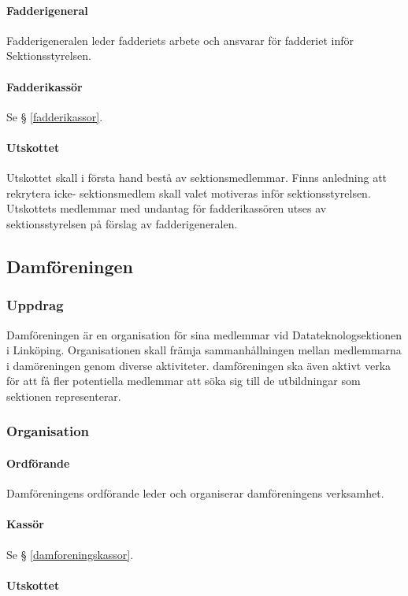 \documentclass{datateknologsektionen-document}
\begin{document}
\paragraph{Fadderigeneral}
Fadderigeneralen leder fadderiets arbete och ansvarar för fadderiet inför Sektionsstyrelsen.
\paragraph{Fadderikassör}
Se § \ref{fadderikassor}.
\paragraph{Utskottet}

Utskottet skall i första hand bestå av sektionsmedlemmar. Finns anledning att rekrytera icke-
sektionsmedlem skall valet motiveras inför sektionsstyrelsen. Utskottets medlemmar med
undantag för fadderikassören utses av sektionsstyrelsen på förslag av fadderigeneralen.
\subsection{Damföreningen}
\label{damforeningen}
\subsubsection{Uppdrag}
Damföreningen är en organisation för sina medlemmar vid Datateknologsektionen i Linköping.
Organisationen skall främja sammanhållningen mellan medlemmarna i damöreningen genom
diverse aktiviteter. damföreningen ska även aktivt verka för att få fler potentiella medlemmar
att söka sig till de utbildningar som sektionen representerar.

\subsubsection{Organisation}
\paragraph{Ordförande}
Damföreningens ordförande leder och organiserar damföreningens verksamhet.
\paragraph{Kassör}
Se § \ref{damforeningskassor}.
\paragraph{Utskottet}
\end{document}
